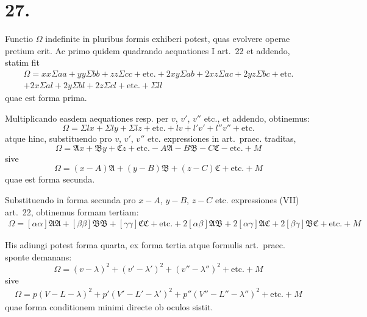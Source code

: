 \documentclass[12pt,a4paper]{book}
\begin{document}
\section*{27.}
\label{sec:art27}

Functio $\Omega$ indefinite in pluribus formis exhiberi potest, quas evolvere operae pretium erit. Ac primo quidem quadrando aequationes I art.~22 et addendo, statim fit
%
\begin{multline*}
\Omega = xx\Sigma aa+yy\Sigma bb+zz\Sigma cc+\text{etc.}+2xy\Sigma ab+2xz\Sigma ac+2yz\Sigma bc+\text{etc.}\\
+2x\Sigma al+2y\Sigma bl+2z\Sigma cl+\text{etc.}+\Sigma ll
\end{multline*}
quae est forma prima.

Multiplicando easdem aequationes resp. per $v$, $v'$, $v''$ etc., et addendo, obtinemus:
%
\begin{equation*}
\Omega=\Sigma lx+\Sigma ly+\Sigma lz+\text{etc.}+lv+l'v'+l''v''+\text{etc.}
\end{equation*}
atque hinc, substituendo pro $v$, $v'$, $v''$ etc. expressiones in art.~praec. traditas,
%
\begin{equation*}
\Omega=\mathfrak{A}x+\mathfrak{B}y+\mathfrak{C}z+\text{etc.}-A\mathfrak{A}-B\mathfrak{B}-C\mathfrak{C}-\text{etc.}+M
\end{equation*}
sive
%
\begin{equation*}
\Omega=(x-A)\mathfrak{A}+(y-B)\mathfrak{B}+(z-C)\mathfrak{C}+\text{etc.}+M
\end{equation*}
quae est forma secunda.

Substituendo in forma secunda pro $x-A$, $y-B$, $z-C$ etc. expressiones (VII) art.~22, obtinemus formam tertiam:
%
\begin{multline*}
\Omega=[\alpha\alpha]\mathfrak{A}\mathfrak{A}+[\beta\beta]\mathfrak{B}\mathfrak{B}+[\gamma\gamma]\mathfrak{C}\mathfrak{C}+\text{etc.}+2[\alpha\beta]\mathfrak{A}\mathfrak{B}+2[\alpha\gamma]\mathfrak{A}\mathfrak{C}+2[\beta\gamma]\mathfrak{B}\mathfrak{C}+\text{etc.}+M
\end{multline*}

His adiungi potest forma quarta, ex forma tertia atque formulis art.~praec. sponte demanans:
%
\begin{equation*}
\Omega=(v-\lambda)^2+(v'-\lambda')^2+(v''-\lambda'')^2+\text{etc.}+M
\end{equation*}
sive
%
\begin{multline*}
\Omega=p(V-L-\lambda)^2+p'(V'-L'-\lambda')^2+p''(V''-L''-\lambda'')^2+\text{etc.}+M
\end{multline*}
quae forma conditionem minimi directe ob oculos sistit.
\end{document}
